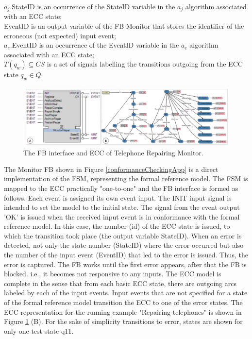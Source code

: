 \documentclass{ieeeojies}
\begin{document}
\begin{algorithm}[t]
$a_j$.StateID is an occurrence of the  StateID  variable in the $a_j$ algorithm  associated with an ECC state;   \\

EventID is an  output variable of the FB Monitor that stores the identifier of the erroneous (not expected) input event; \\

$a_e$.EventID is an  occurrence of the EventID variable in the $a_e$ algorithm associated with an ECC state; \\

$T(q_w) \subseteq CS$ is a set of signals labelling the transitions outgoing from the ECC state $q_w \in Q$.

\end{algorithm}

\begin{figure}[!t]
	\centering
	\includegraphics[width=1\textwidth]{images/MR.PNG}
	\caption{The FB interface and ECC of Telephone Repairing Monitor.}
	\label{TR_MonitorFB}
\end{figure}

The Monitor FB shown in Figure \ref{conformanceCheckingApp}  is a direct implementation of the FSM, representing the formal reference model. The FSM is mapped to the ECC practically "one-to-one" and the FB interface is formed as follows. Each event is assigned its own event input. The INIT input signal is intended to set the model to the initial state. The signal from the event output 'OK' is issued when the received input event is in conformance with the formal reference model. In this case, the number (id) of the ECC state is issued, to which the transition took place (the output variable StateID). When an error is detected, not only the state number (StateID) where the error occurred but also the number of the input event (EventID) that led to the error is issued. Thus, the error is captured. The FB works until the first error appears, after that the FB is blocked. i.e., it becomes not responsive to any inputs. The ECC model is complete in the sense that from each basic ECC state, there are outgoing arcs labeled by each of the input events. Input events that are not specified for a state of the formal reference model transition the ECC to one of the error states. The ECC representation for the running example "Repairing telephones" is shown in Figure \ref{TR_MonitorFB} (B). For the sake of simplicity transitions to error, states are shown for only one test state q11.
\end{document}
